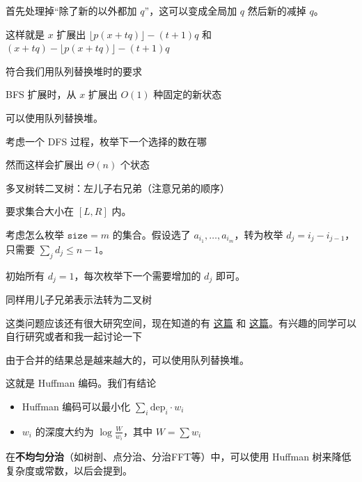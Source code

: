 \begin{example}[蚯蚓]
    
\end{example}
\begin{solution}
    首先处理掉“除了新的以外都加 $q$”，这可以变成全局加 $q$ 然后新的减掉 $q$。

    这样就是 $x$ 扩展出 $\lfloor p(x+tq)\rfloor-(t+1)q$ 和 $(x+tq)-\lfloor p(x+tq)\rfloor-(t+1)q$

    符合我们用队列替换堆时的要求
\end{solution}
\begin{example}[常数种非负边权的最短路]
    BFS 扩展时，从 $x$ 扩展出 $O(1)$ 种固定的新状态

    可以使用队列替换堆。
\end{example}
\begin{example}[前 $k$ 小子集和]

\end{example}
\begin{solution}
    考虑一个 DFS 过程，枚举下一个选择的数在哪

    然而这样会扩展出 $\Theta(n)$ 个状态

    多叉树转二叉树：左儿子右兄弟（注意兄弟的顺序）
\end{solution}
\begin{example}
    要求集合大小在 $[L,R]$ 内。
\end{example}
\begin{solution}
    考虑怎么枚举 $\mathtt{size}=m$ 的集合。假设选了 $a_{i_1},\ldots,a_{i_m}$，转为枚举 $d_j=i_j-i_{j-1}$，只需要 $\sum_j d_j\le n-1$。
    
    初始所有 $d_j=1$，每次枚举下一个需要增加的 $d_j$ 即可。

    同样用儿子兄弟表示法转为二叉树
\end{solution}
\begin{remark}
    这类问题应该还有很大研究空间，现在知道的有 \href{https://www.cnblogs.com/AK-IOI/p/18418766}{这篇} 和 \href{https://www.cnblogs.com/Cry-For-theMoon/p/17629760.html}{这篇}。有兴趣的同学可以自行研究或者和我一起讨论一下
\end{remark}
\begin{example}[合并果子]
    由于合并的结果总是越来越大的，可以使用队列替换堆。
\end{example}
\begin{remark}
    这就是 Huffman 编码。我们有结论

    \begin{itemize}
        \item Huffman 编码可以最小化 $\sum_i \mathrm{dep}_i\cdot w_i$
        \item $w_i$ 的深度大约为 $\log\frac{W}{w_i}$，其中 $W=\sum w_i$
    \end{itemize}

    在\textbf{不均匀分治}（如树剖、点分治、分治FFT等）中，可以使用 Huffman 树来降低复杂度或常数，以后会提到。
\end{remark}

